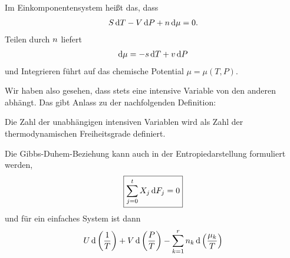 Im Einkomponentensystem heißt das, dass
\begin{align*}
    S\mathop{}\!\mathrm{d} T - V\mathop{}\!\mathrm{d} P + n \mathop{}\!\mathrm{d} \mu = 0.
\end{align*}
Teilen durch $n$ liefert
\begin{align*}
    \mathop{}\!\mathrm{d} \mu = -s \mathop{}\!\mathrm{d} T + v\mathop{}\!\mathrm{d} P
\end{align*}
und Integrieren führt auf das chemische Potential $\mu=\mu(T,P)$.

Wir haben also gesehen, dass stets eine intensive Variable von den anderen abhängt. Das gibt Anlass zu der nachfolgenden Definition:
\begin{formal}
    Die Zahl der unabhängigen intensiven Variablen wird als Zahl der thermodynamischen Freiheitsgrade definiert.
\end{formal}

Die Gibbs-Duhem-Beziehung kann auch in der Entropiedarstellung formuliert werden,
\begin{align*}
    \boxed{\sum_{j=0}^t X_j \mathop{}\!\mathrm{d} F_j = 0}
\end{align*}
und für ein einfaches System ist dann
\begin{align*}
    U\mathop{}\!\mathrm{d}\left(\frac{1}{T}\right) + V\mathop{}\!\mathrm{d}\left(\frac{P}{T}\right)-\sum_{k=1}^r n_k\mathop{}\!\mathrm{d}\left(\frac{\mu_k}{T}\right)
\end{align*}